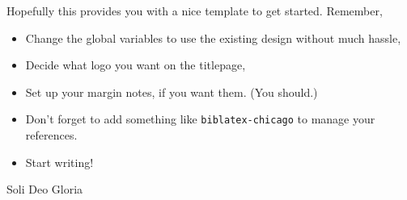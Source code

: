 \documentclass[letterpaper,
               extrafontsizes,
               11pt,
               oneside,
               final]{memoir}   %
\theoremstyle{plain}                        %
\theoremstyle{definition}
\theoremstyle{remark}
\begin{document}
Hopefully this provides you with a nice template to get started. Remember,
\begin{itemize}
  \item Change the global variables to use the existing design without much hassle,
  \item Decide what logo you want on the titlepage,
  \item Set up your margin notes, if you want them. (You should.)
  \item Don't forget to add something like \verb|biblatex-chicago| to manage your references.
  \item Start writing!
\end{itemize}

\vfill

\begin{center}
  {\large\swshape Soli Deo Gloria}
\end{center}

\end{document}
